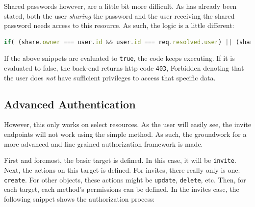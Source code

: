 			Shared passwords however, are a little bit more difficult. As has already been stated, both the user \emph{sharing} the password and the user receiving the shared password needs access to this resource. As such, the logic is a little different:
			\begin{lstlisting}[gobble=16,language=JavaScript]
                if( (share.owner === user.id && user.id === req.resolved.user) || (share.origin_owner === user.id && user.id === req.resolved.user)){
			\end{lstlisting}
		
			If the above snippets are evaluated to \verb=true=, the code keeps executing. If it is evaluated to false, the back-end returns http code \verb=403=, Forbidden denoting that the user does \emph{not} have sufficient privileges to access that specific data.

		\subsection{Advanced Authentication}
			However, this only works on select resources. As the user will easily see, the invite endpoints will not work using the simple method. As such, the groundwork for a more advanced and fine grained authorization framework is made.

			First and foremost, the basic target is defined. In this case, it will be \verb=invite=. Next, the actions on this target is defined. For invites, there really only is one: \verb=create=. For other objects, these actions might be \verb=update=, \verb=delete=, etc. Then, for each target, each method's permissions can be defined. In the invites case, the following snippet shows the authorization process:

